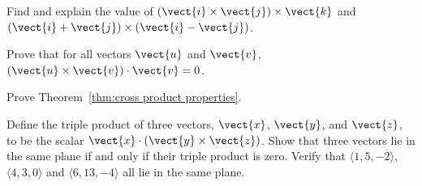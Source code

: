 \begin{enumialphparenastyle}
\begin{ex}
Find and explain the value of $(\vect{i} \times \vect{j})
\times \vect{k}$ and $(\vect{i} + \vect{j}) \times (\vect{i} - \vect{j})$.
\end{ex}

\begin{ex}
Prove that for all vectors $\vect{u}$ and $\vect{v}$,
$(\vect{u}\times\vect{v})\cdot\vect{v}=0$.
\end{ex}

\begin{ex}
Prove Theorem~\ref{thm:cross product properties}.
\end{ex}

\begin{ex}
Define the triple product of three vectors, $\vect{x}$,
$\vect{y}$, and $\vect{z}$, to be the scalar $\vect{x} \cdot (\vect{y} \times
\vect{z})$.  Show that three vectors lie in the same plane if and only if
their triple product is zero. Verify that $\langle 1, 5, -2 \rangle$,
$\langle 4, 3, 0 \rangle$ and $\langle 6, 13, -4 \rangle$ all lie in the same plane.
\end{ex}

\end{enumialphparenastyle}
